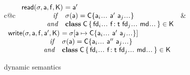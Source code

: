 \documentclass[acmlarge, anonymous, authordraft]{acmart}
\begin{document}
\begin{figure}[!t]
\medskip
\begin{tabular}{c@{\hspace{-0.6em}}c}
\(
\begin{array}{r@{~}l}
\readf \s\a\f\K &= \ap\\ 
    ~~\mathit{if}~~ &\s(\a) = \obj\C{\a_i \dots ~\ap~ \a_j \dots}\\
    ~~\mathit{and}~~ &\Class\C {\fd_i \dots ~\Fdef{\f}{\t}~ \fd_j \dots}{\md \dots}\in\K \\
\end{array} 
\) &
\(
\begin{array}{r@{~}l}
\setf \s\a\f\ap\K &= \Map\s{\Bind{\a}{\obj\C{\a_i\dots ~\ap~ \a_j\dots}}}\\
  ~~\mathit{if}~~ &\s(\a) = \obj\C{\a_i\dots ~\app~ \a_j\dots} \\
  ~~\mathit{and}~~&\Class\C{\fd_i \dots ~\Fdef{\f}{\t}~ \fd_j\dots}{\md \dots}\in\K
\end{array}
\)
\end{tabular}
\medskip

\hrulefill
\caption{\kafka dynamic semantics}\label{fig:semantics}
\end{figure}



\end{document}
